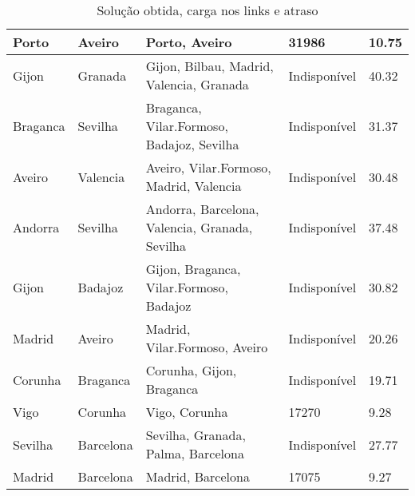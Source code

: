 \begin{table}[!htb]
{\begin{tabular}{|l|l|l|l|l|}
Porto & Aveiro & Porto, Aveiro & 31986 & 10.75 \\ \hline
Gijon & Granada & Gijon, Bilbau, Madrid, Valencia, Granada & Indisponível & 40.32 \\ \hline
Braganca & Sevilha & Braganca, Vilar.Formoso, Badajoz, Sevilha & Indisponível & 31.37 \\ \hline
Aveiro & Valencia & Aveiro, Vilar.Formoso, Madrid, Valencia & Indisponível & 30.48 \\ \hline
Andorra & Sevilha & Andorra, Barcelona, Valencia, Granada, Sevilha & Indisponível & 37.48 \\ \hline
Gijon & Badajoz & Gijon, Braganca, Vilar.Formoso, Badajoz & Indisponível & 30.82 \\ \hline
Madrid & Aveiro & Madrid, Vilar.Formoso, Aveiro & Indisponível & 20.26 \\ \hline
Corunha & Braganca & Corunha, Gijon, Braganca & Indisponível & 19.71 \\ \hline
Vigo & Corunha & Vigo, Corunha & 17270 & 9.28 \\ \hline
Sevilha & Barcelona & Sevilha, Granada, Palma, Barcelona & Indisponível & 27.77 \\ \hline
Madrid & Barcelona & Madrid, Barcelona & 17075 & 9.27 \\ \hline
\end{tabular}}
\caption[]{Solução obtida, carga nos links e atraso}
\end{table}

